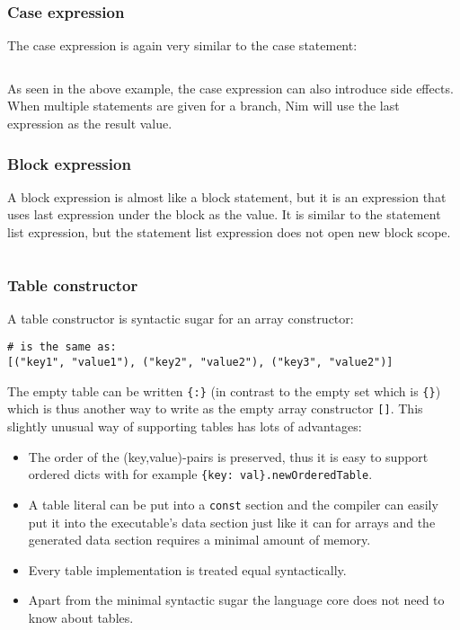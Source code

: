 \hypertarget{case-expression}{%
\subsubsection{Case expression}\label{case-expression}}

The {case expression} is again very similar to the case statement:

\begin{verbatim}
\end{verbatim}

As seen in the above example, the case expression can also introduce
side effects. When multiple statements are given for a branch, Nim will
use the last expression as the result value.

\hypertarget{block-expression}{%
\subsubsection{Block expression}\label{block-expression}}

A {block expression} is almost like a block statement, but it is an
expression that uses last expression under the block as the value. It is
similar to the statement list expression, but the statement list
expression does not open new block scope.

\begin{verbatim}
\end{verbatim}

\hypertarget{table-constructor}{%
\subsubsection{Table constructor}\label{table-constructor}}

A table constructor is syntactic sugar for an array constructor:

\begin{verbatim}
# is the same as:
[("key1", "value1"), ("key2", "value2"), ("key3", "value2")]
\end{verbatim}

The empty table can be written \texttt{\{:\}} (in contrast to the empty
set which is \texttt{\{\}}) which is thus another way to write as the
empty array constructor \texttt{{[}{]}}. This slightly unusual way of
supporting tables has lots of advantages:

\begin{itemize}
\tightlist
\item
  The order of the (key,value)-pairs is preserved, thus it is easy to
  support ordered dicts with for example
  \texttt{\{key:\ val\}.newOrderedTable}.
\item
  A table literal can be put into a \texttt{const} section and the
  compiler can easily put it into the executable's data section just
  like it can for arrays and the generated data section requires a
  minimal amount of memory.
\item
  Every table implementation is treated equal syntactically.
\item
  Apart from the minimal syntactic sugar the language core does not need
  to know about tables.
\end{itemize}


